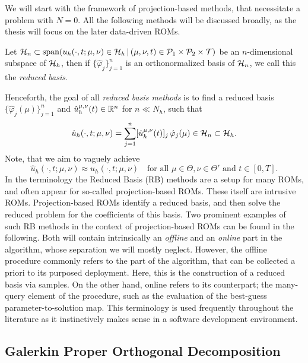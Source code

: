 We will start with the framework of projection-based methods, that necessitate a problem with $N = 0$.
All the following methods will be discussed broadly, as the thesis will focus on the later data-driven ROMs. 

\begin{definition}
    Let $\mathcal{H}_n \subset \operatorname{span}(u_h(\cdot, t; \mu, \nu) \in \mathcal{H}_h \, \vert \,
    (\mu, \nu, t) \in \mathcal{P}_1 \times \mathcal{P}_2 \times \mathcal{T})$ be an $n$-dimensional subspace
    of $\mathcal{H}_h$, then if $\{\hat{\varphi}_j\}_{j=1}^n$ is an orthonormalized basis of $\mathcal{H}_n$, we call this the
    \emph{reduced basis}.
\end{definition}

Henceforth, the goal of all \emph{reduced basis methods} is to find a reduced basis $\{\hat{\varphi}_j(\mu)\}_{j=1}^n$ 
and $\hat{u}_h^{\mu, \nu}(t) \in \mathbb{R}^n$ for $n \ll N_h$, such that
\begin{equation*}
    \hat{u}_h(\cdot, t; \mu, \nu) = \sum_{j=1}^{n} [\hat{u}_h^{\mu, \nu}(t)]_j \, \hat{\varphi}_j(\mu) \in \mathcal{H}_n \subset \mathcal{H}_h.
\end{equation*}
Note, that we aim to vaguely achieve
\begin{equation*}
    \hat{u}_h(\cdot, t; \mu, \nu) \approx u_h(\cdot, t; \mu, \nu) \quad \text{for all } \mu \in \Theta, \nu \in \Theta'
    \text{ and } t \in [0, T].
\end{equation*}
In the terminology the Reduced Basis (RB) methods are a setup for many ROMs, and often appear for so-called
projection-based ROMs. These itself are 
intrusive ROMs. Projection-based ROMs identify a reduced basis, and then solve the reduced problem
for the coefficients of this basis.
Two prominent examples of such RB methods in the context of projection-based ROMs can be found in the following. 
Both will contain intrinsically an \emph{offline}
and an \emph{online} part in the algorithm, whose separation we will mostly neglect. However, 
the offline procedure commonly refers to the part of the algorithm, that can be collected a priori to 
its purposed deployment. Here, this is the construction of a reduced basis via samples. 
On the other hand, online refers to its counterpart; the many-query element of the procedure, such as the evaluation of the 
best-guess parameter-to-solution map. This terminology is used frequently throughout the literature as it instinctively 
makes sense in a software development environment.


\subsection{Galerkin Proper Orthogonal Decomposition}

